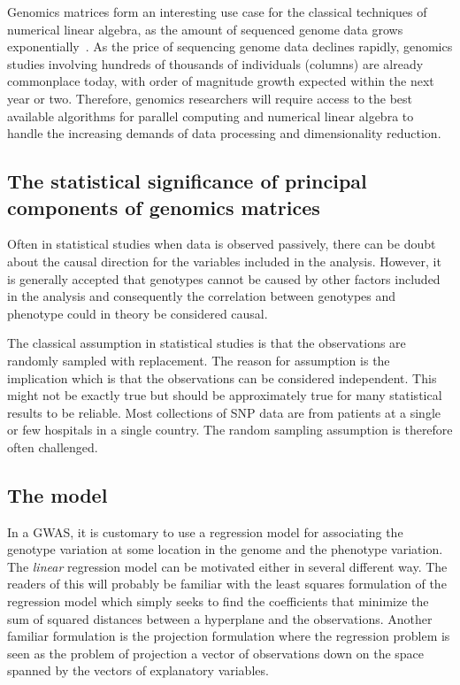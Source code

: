 \documentclass[final,leqno]{siamltex1213}
\begin{document}
Genomics matrices form an interesting use case for the classical techniques of
numerical linear algebra, as the amount of sequenced genome data grows
exponentially~\cite{Stephens2015}. As the price of sequencing genome data declines
rapidly, genomics studies involving hundreds of thousands of individuals (columns)
are already commonplace today, with order of magnitude growth expected within the next year or two. Therefore, genomics researchers will require access to the best
available algorithms for parallel computing and numerical linear algebra to
handle the increasing demands of data processing and dimensionality reduction.

\subsection{The statistical significance of principal components of genomics matrices}

Often in statistical studies when data is observed passively, there can be doubt about the causal direction for the variables included in the analysis. However, it is generally accepted that genotypes cannot be caused by other factors included in the analysis and consequently the correlation between genotypes and phenotype could in theory be considered causal.

The classical assumption in statistical studies is that the observations are randomly sampled with replacement. The reason for assumption is the implication which is that the observations can be considered independent. This might not be exactly true but should be approximately true for many statistical results to be reliable. Most collections of SNP data are from patients at a single or few hospitals in a single country. The random sampling assumption is therefore often challenged.

\subsection{The model}
In a GWAS, it is customary to use a regression model for associating the genotype variation at some location in the genome and the phenotype variation. The \emph{linear} regression model can be motivated either in several different way. The readers of this will probably be familiar with the least squares formulation of the regression model which simply seeks to find the coefficients that minimize the sum of squared distances between a hyperplane and the observations. Another familiar formulation is the projection formulation where the regression problem is seen as the problem of projection a vector of observations down on the space spanned by the vectors of explanatory variables.
\end{document}
